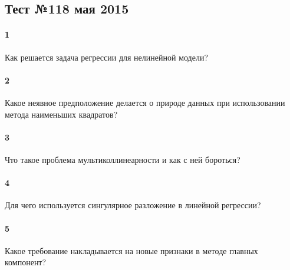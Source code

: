 \documentclass[a4paper,12pt]{article}
\begin{document}
  \subsection*{Тест №11\hfill{8 мая 2015}}


  \paragraph{1} Как решается задача регрессии для нелинейной модели?

	\makebox[\linewidth]{\hrulefill}
	\makebox[\linewidth]{\hrulefill}
	\makebox[\linewidth]{\hrulefill}
	\makebox[\linewidth]{\hrulefill}
	
  \paragraph{2} Какое неявное предположение делается о природе данных при использовании метода наименьших квадратов?

	\makebox[\linewidth]{\hrulefill}
	\makebox[\linewidth]{\hrulefill}

  \paragraph{3} Что такое проблема мультиколлинеарности и как с ней бороться?

  \makebox[\linewidth]{\hrulefill}
  \makebox[\linewidth]{\hrulefill}
  \makebox[\linewidth]{\hrulefill}
  \makebox[\linewidth]{\hrulefill}

  \paragraph{4} Для чего используется сингулярное разложение в линейной регрессии?
  
  \makebox[\linewidth]{\hrulefill}
  \makebox[\linewidth]{\hrulefill}
  \makebox[\linewidth]{\hrulefill}
  \makebox[\linewidth]{\hrulefill}  
  
  \paragraph{5} Какое требование накладывается на новые признаки в методе главных компонент?

  \makebox[\linewidth]{\hrulefill}
  \makebox[\linewidth]{\hrulefill}
  \makebox[\linewidth]{\hrulefill}
  \makebox[\linewidth]{\hrulefill}
\end{document}
